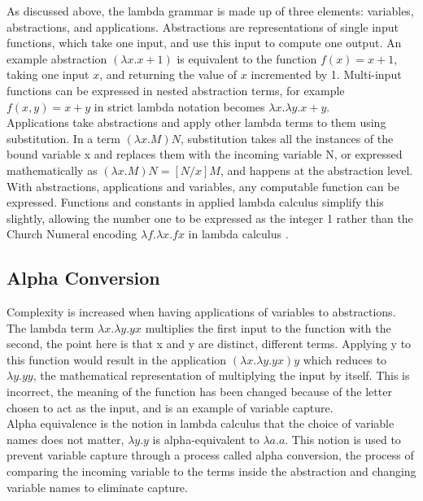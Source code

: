 \documentclass[a4paper,11pt]{report}
\begin{document}
As discussed above, the lambda grammar is made up of three elements: variables, abstractions, and applications. Abstractions are representations of single input functions, which take one input, and use this input to compute one output. An example abstraction $(\lambda x.x+1)$ is equivalent to the function $f(x) = x+1$, taking one input $x$, and returning the value of $x$ incremented by 1. Multi-input functions can be expressed in nested abstraction terms, for example $f(x,y)=x+y$ in strict lambda notation becomes $\lambda x.\lambda y.x+y$.\\

Applications take abstractions and apply other lambda terms to them using substitution. In a term $(\lambda x.M)N$, substitution takes all the instances of the bound variable x and replaces them with the incoming variable N, or expressed mathematically as $(\lambda x.M)N=[N / x]M$, and happens at the abstraction level.\\

With abstractions, applications and variables, any computable function can be expressed. Functions and constants in applied lambda calculus simplify this slightly, allowing the number one to be expressed as the integer 1 rather than the Church Numeral encoding $\lambda f.\lambda x.fx$ in lambda calculus \cite{Tarau2017}.

\subsection{Alpha Conversion}

Complexity is increased when having applications of variables to abstractions. The lambda term $\lambda x.\lambda y.yx$ multiplies the first input to the function with the second, the point here is that x and y are distinct, different terms. Applying y to this function would result in the application $(\lambda x.\lambda y.yx)y$ which reduces to $\lambda y.yy$, the mathematical representation of multiplying the input by itself. This is incorrect, the meaning of the function has been changed because of the letter chosen to act as the input, and is an example of variable capture.\\

Alpha equivalence is the notion in lambda calculus that the choice of variable names does not matter, $\lambda y.y$ is alpha-equivalent to $\lambda a.a$. This notion is used to prevent variable capture through a process called alpha conversion, the process of comparing the incoming variable to the terms inside the abstraction and changing variable names to eliminate capture.\\
\end{document}
